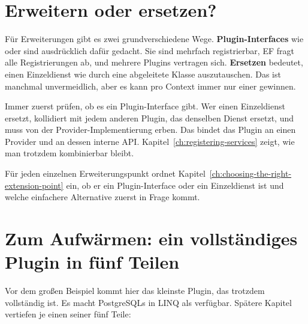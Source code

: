 \section{Erweitern oder ersetzen?}

Für Erweiterungen gibt es zwei grundverschiedene Wege. \textbf{Plugin-Interfaces} wie
 oder
 sind ausdrücklich dafür gedacht. Sie
sind mehrfach registrierbar, EF fragt alle Registrierungen ab, und mehrere Plugins vertragen
sich. \textbf{Ersetzen} bedeutet, einen Einzeldienst wie
 durch eine abgeleitete Klasse
auszutauschen. Das ist manchmal unvermeidlich, aber es kann pro Context immer nur einer
gewinnen.

\begin{important}
  Immer zuerst prüfen, ob es ein Plugin-Interface gibt. Wer einen Einzeldienst ersetzt,
  kollidiert mit jedem anderen Plugin, das denselben Dienst ersetzt, und muss von der
  Provider-Implementierung erben. Das bindet das Plugin an einen Provider und an dessen
  interne API. Kapitel~\ref{ch:registering-services} zeigt, wie man trotzdem kombinierbar
  bleibt.
\end{important}

Für jeden einzelnen Erweiterungspunkt ordnet
Kapitel~\ref{ch:choosing-the-right-extension-point} ein, ob er ein Plugin-Interface oder ein Einzeldienst ist und welche einfachere Alternative
zuerst in Frage kommt.

\section{Zum Aufwärmen: ein vollständiges Plugin in fünf Teilen}

Vor dem großen Beispiel kommt hier das kleinste Plugin, das trotzdem vollständig ist. Es
macht PostgreSQLs  in LINQ als
verfügbar. Spätere Kapitel vertiefen je einen seiner fünf Teile:

